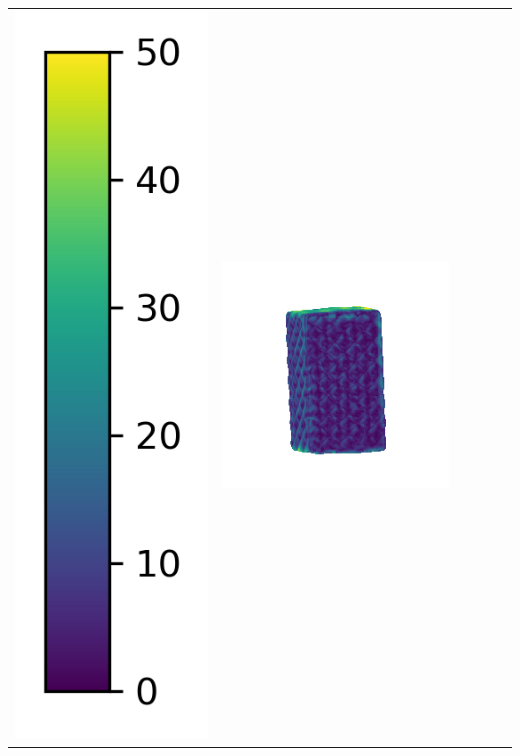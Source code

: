 \begin{center}
\begin{tabularx}{\linewidth}{@{}Y@{}Y@{}Y@{}Y@{}Y@{}Y@{}}
\includegraphics[width=0.2\linewidth]{semisynthetic/colorbar_error_vertical.png} &
\includegraphics[width=\linewidth]{semisynthetic/20150514_18_ours_err.png} &

\end{tabularx}
\end{center}
